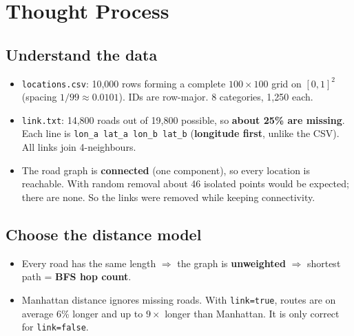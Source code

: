 \documentclass[11pt,a4paper]{article}
\newcommand{\code}[1]{\texttt{#1}}
\begin{document}
\section{Thought Process}

\subsection{Understand the data}
\begin{itemize}
  \item \code{locations.csv}: 10{,}000 rows forming a complete $100\times100$ grid on $[0,1]^2$
        (spacing $1/99 \approx 0.0101$). IDs are row-major. 8 categories, 1{,}250 each.
  \item \code{link.txt}: 14{,}800 roads out of 19{,}800 possible, so \textbf{about 25\% are missing}.
        Each line is \code{lon\_a lat\_a lon\_b lat\_b} (\textbf{longitude first}, unlike the CSV).
        All links join 4-neighbours.
  \item The road graph is \textbf{connected} (one component), so every location is reachable.
        With random removal about 46 isolated points would be expected; there are none.
        So the links were removed while keeping connectivity.
\end{itemize}

\subsection{Choose the distance model}
\begin{itemize}
  \item Every road has the same length $\Rightarrow$ the graph is \textbf{unweighted}
        $\Rightarrow$ shortest path = \textbf{BFS hop count}.
  \item Manhattan distance ignores missing roads. With \code{link=true}, routes are on average
        6\% longer and up to $9\times$ longer than Manhattan. It is only correct for \code{link=false}.
\end{itemize}
\end{document}
